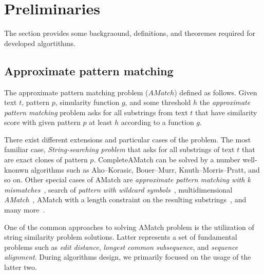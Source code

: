 \section{Preliminaries}
\label{section:preliminaries}

The section provides some backgraound, definitions, and theoremes required for
developed algortithms.

\subsection{Approximate pattern matching}
The approximate pattern matching problem ($AMatch$) defined as follows.
Given text $t$, pattern $p$, simularity function $g$, and some threshold $h$ the \emph{approximate pattern matching} problem asks for all substrings from text $t$ that have similarity score  with given pattern $p$ at least $h$ according to a function $g$.  

There exist different extensions and particular cases of the problem.
The most familiar case, \emph{String-searching problem} that asks for all substrings of text $t$ that are exact clones of pattern $p$.
CompleteAMatch can be solved by a number well-knonwn algorithms such as Aho--Korasic, Bouer--Murr, Knuth--Morris--Pratt, and so on.
Other special cases of AMatch are \emph{approximate pattern matching with k mismatches}~\cite{amir2004faster}, search of \emph{pattern with wildcard symbols}~\cite{arslan2015pattern}, multidimensional \emph{AMatch}~\cite{baeza2000new}, AMatch with a length constraint on the resulting substrings~\cite{luciv2019interactive}, and many more~\cite{tiskin2011towards, lipsky2011approximate,navarro2000improved,zhang2017approximate}.

One of the common approaches to solving AMatch problem is the utilization of string similarity problem solutions.
Latter represents a set of fundamental problems such as \emph{edit distance}, \emph{longest common subsequence}, and \emph{sequence alignment}.
During algorithms design, we primarily focused on the usage of the latter two.

